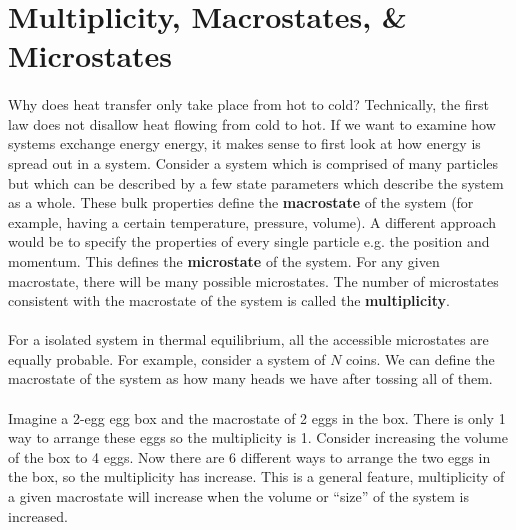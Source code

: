 \documentclass[../thermodynamics.tex]{subfiles}
\begin{document}
    \section{Multiplicity, Macrostates, \& Microstates}
        \paragraph{}
        Why does heat transfer only take place from hot to cold?
        Technically, the first law does not disallow heat flowing from cold to hot.
        If we want to examine how systems exchange energy energy, it makes sense to first look at how energy is spread out in a system.
        Consider a system which is comprised of many particles but which can be described by a few state parameters which describe the system as a whole.
        These bulk properties define the \textbf{macrostate} of the system (for example, having a certain temperature, pressure, volume).
        A different approach would be to specify the properties of every single particle e.g. the position and momentum.
        This defines the \textbf{microstate} of the system.
        For any given macrostate, there will be many possible microstates.
        The number of microstates consistent with the macrostate of the system is called the \textbf{multiplicity}.

        \paragraph{}
        For a isolated system in thermal equilibrium, all the accessible microstates are equally probable.
        For example, consider a system of $N$ coins.
        We can define the macrostate of the system as how many heads we have after tossing all of them.

        \paragraph{}
        Imagine a 2-egg egg box and the macrostate of 2 eggs in the box.
        There is only 1 way to arrange these eggs so the multiplicity is 1.
        Consider increasing the volume of the box to 4 eggs.
        Now there are 6 different ways to arrange the two eggs in the box, so the multiplicity has increase.
        This is a general feature, multiplicity of a given macrostate will increase when the volume or ``size'' of the system is increased.
\end{document}
